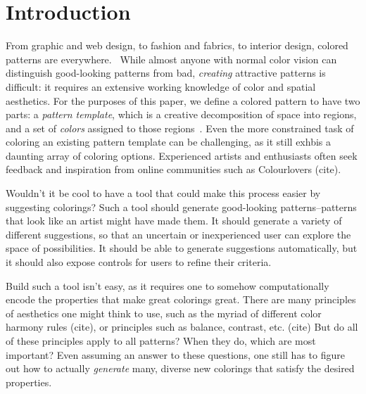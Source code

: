 \section{Introduction}
\label{sec:introduction}

From graphic and web design, to fashion and fabrics, to interior design, colored patterns are everywhere.~ While almost anyone with normal color vision can distinguish good-looking patterns from bad, \emph{creating} attractive patterns is difficult: it requires an extensive working knowledge of color and spatial aesthetics. For the purposes of this paper, we define a colored pattern to have two parts: a \emph{pattern template}, which is a creative decomposition of space into regions, and a set of \emph{colors} assigned to those regions~. Even the more constrained task of coloring an existing pattern template can be challenging, as it still exhbis a daunting array of coloring options. Experienced artists and enthusiasts often seek feedback and inspiration from online communities such as Colourlovers (cite).

Wouldn't it be cool to have a tool that could make this process easier by suggesting colorings? Such a tool should generate good-looking patterns--patterns that look like an artist might have made them. It should generate a variety of different suggestions, so that an uncertain or inexperienced user can explore the space of possibilities. It should be able to generate suggestions automatically, but it should also expose controls for users to refine their criteria.

Build such a tool isn't easy, as it requires one to somehow computationally encode the properties that make great colorings great. There are many principles of aesthetics one might think to use, such as the myriad of different color harmony rules (cite), or principles such as balance, contrast, etc. (cite) But do all of these principles apply to all patterns? When they do, which are most important? Even assuming an answer to these questions, one still has to figure out how to actually \emph{generate} many, diverse new colorings that satisfy the desired properties.

